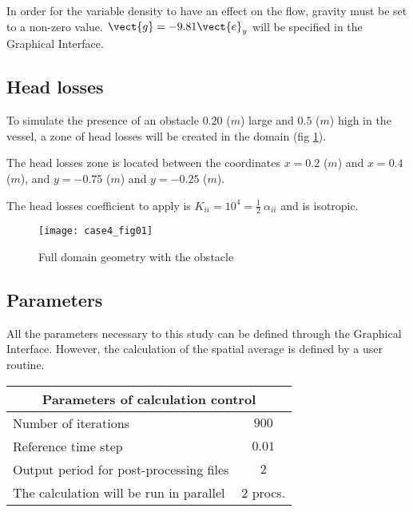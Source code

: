 In order for the variable density to have an effect on the flow, gravity must be
set to a non-zero value. $\vect{g} = -9.81 \vect{e}_y$ will be specified in the
Graphical Interface.


        \subsection{Head losses}

To simulate the presence of an obstacle $0.20$ ($m$) large and $0.5$ ($m$) high in the
vessel, a zone of head losses will be created in the domain (fig \ref{figante41}).

The head losses zone is located between the coordinates $x=0.2$ ($m$) and $x= 0.4$ ($m$),
and $y = -0.75$ ($m$) and $y = -0.25$ ($m$).

The head losses coefficient to apply is $K _{ii}=10^4 = \tfrac{1}{2}~\alpha _{ii}$
and is isotropic.

\begin{figure}[h!]
\begin{center}
\texttt{[image: case4\_fig01]}
\caption{Full domain geometry with the obstacle}
\label{figante41}
\end{center}
\end{figure}


        \subsection{Parameters}

All the parameters necessary to this study can be defined through the Graphical
Interface. However, the calculation of the spatial average is defined by a user routine.


\begin{center}
\begin{tabular}{|l|c|}
\hline
\multicolumn{2}{|c|}{Parameters of calculation control} \\
\hline
Number of iterations & $900$ \\
\hline
Reference time step & $0.01$ \\
\hline
Output period for post-processing files& $2$ \\
\hline
The calculation will be run in parallel & 2 procs. \\
\hline
\end{tabular}\\
\end{center}

